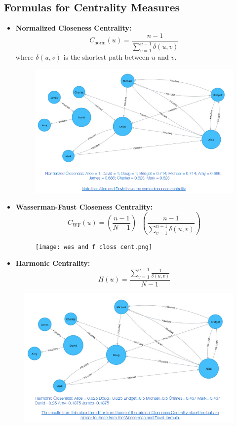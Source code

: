 \subsection{Formulas for Centrality Measures}
\begin{itemize}
    \item \textbf{Normalized Closeness Centrality:}
    \[
    C_{\text{norm}}(u) = \frac{n-1}{\sum_{v=1}^{n-1} \delta(u,v)}
    \]
    where \( \delta(u,v) \) is the shortest path between \( u \) and \( v \).
\begin{figure}[H]
    \centering
    \includegraphics[width=0.75\linewidth]{image.png}
    \label{fig:enter-label}
\end{figure}
    

    \item \textbf{Wasserman-Faust Closeness Centrality:}
    \[
    C_{\text{WF}}(u) = \left(\frac{n-1}{N-1}\right) \cdot \left(\frac{n-1}{\sum_{v=1}^{n-1} \delta(u,v)}\right)
    \]
\begin{figure}[H]
    \centering
    \texttt{[image: wes and f closs cent.png]}
    \label{fig:enter-label}
\end{figure}


    \item \textbf{Harmonic Centrality:}
    \[
    H(u) = \frac{\sum_{v=1}^{n-1} \frac{1}{\delta(u,v)}}{N-1}
    \]
\end{itemize}
\begin{figure}[H]
    \centering
    \includegraphics[width=0.75\linewidth]{Harmonic cent.png}
    \label{fig:enter-label}
\end{figure}


